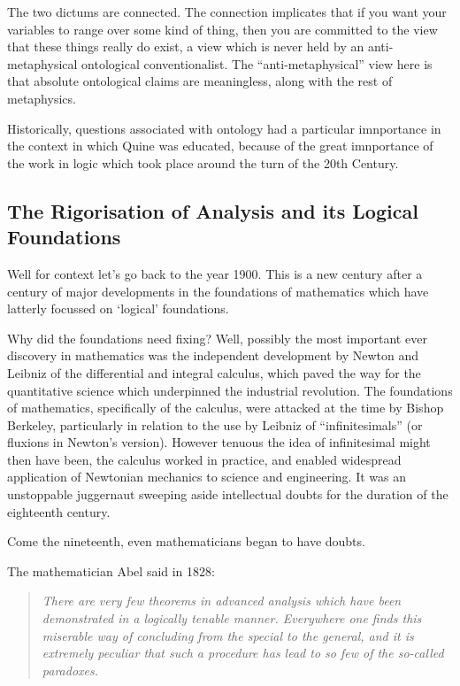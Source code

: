 \documentclass[10pt,titlepage]{book}
\begin{document}
The two dictums are connected.
The connection implicates that if you want your variables to range over some kind of thing, then you are committed to the view that these things really do exist, a view which is never held by an anti-metaphysical ontological conventionalist.
The ``anti-metaphysical'' view here is that absolute ontological claims are meaningless, along with the rest of metaphysics.

Historically, questions associated with ontology had a particular imnportance in the context in which Quine was educated, because of the great imnportance of the work in logic which took place around the turn of the 20th Century.

\subsection{The Rigorisation of Analysis and its Logical Foundations}

Well for context let's go back to the year 1900.
This is a new century after a century of major developments in the foundations of mathematics which have latterly focussed on `logical' foundations.

Why did the foundations need fixing?
Well, possibly the most important ever discovery in mathematics was the independent development by Newton and Leibniz of the differential and integral calculus, which paved the way for the quantitative science which underpinned the industrial revolution.
The foundations of mathematics, specifically of the calculus, were attacked at the time by Bishop Berkeley, particularly in relation to the use by Leibniz of ``infinitesimals'' (or fluxions in Newton's version).
However tenuous the idea of infinitesimal might then have been, the calculus worked in practice, and enabled widespread application of Newtonian mechanics to science and engineering.
It was an unstoppable juggernaut sweeping aside intellectual doubts for the duration of the eighteenth century.

Come the nineteenth, even mathematicians began to have doubts.

The mathematician Abel said in 1828:
\begin{quote}
  {\it There are very few theorems in advanced analysis which have been demonstrated in a logically tenable manner. Everywhere one finds this miserable way of concluding from the special to the general, and it is extremely peculiar that such a procedure has lead to so few of the so-called paradoxes.}
\end{quote}
\end{document}
